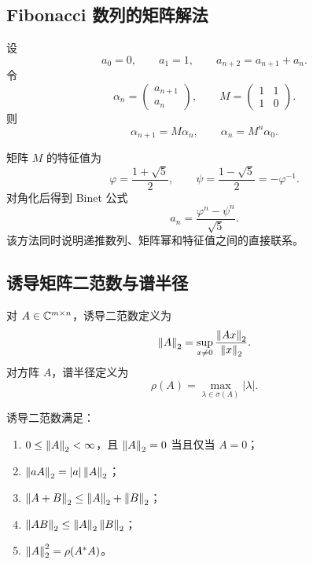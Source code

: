 \subsection{Fibonacci 数列的矩阵解法}

设
\begin{equation}
 a_0=0,
 \qquad a_1=1,
 \qquad a_{n+2}=a_{n+1}+a_n.
\end{equation}
令
\begin{equation}
 \alpha_n=\begin{pmatrix}a_{n+1}\\a_n\end{pmatrix},
 \qquad
 M=\begin{pmatrix}1&1\\1&0\end{pmatrix}.
\end{equation}
则
\begin{equation}
 \alpha_{n+1}=M\alpha_n,
 \qquad
 \alpha_n=M^n\alpha_0.
\end{equation}

矩阵 $M$ 的特征值为
\begin{equation}
 \varphi=\frac{1+\sqrt5}{2},
 \qquad
 \psi=\frac{1-\sqrt5}{2}=-\varphi^{-1}.
\end{equation}
对角化后得到 Binet 公式
\begin{equation}
 a_n=\frac{\varphi^n-\psi^n}{\sqrt5}.
\end{equation}
该方法同时说明递推数列、矩阵幂和特征值之间的直接联系。

\subsection{诱导矩阵二范数与谱半径}

\begin{definition}
对 $A\in\mathbb C^{m\times n}$，诱导二范数定义为
\begin{equation}
 \left\lVert A\right\rVert_2
 =\sup_{x\neq0}\frac{\left\lVert Ax\right\rVert_2}{\left\lVert x\right\rVert_2}.
\end{equation}
对方阵 $A$，谱半径定义为
\begin{equation}
 \rho(A)=\max_{\lambda\in\sigma(A)}|\lambda|.
\end{equation}
\end{definition}

\begin{proposition}
诱导二范数满足：
\begin{enumerate}
  \item $0\leq\left\lVert A\right\rVert_2<\infty$，且 $\left\lVert A\right\rVert_2=0$ 当且仅当 $A=0$；
  \item $\left\lVert aA\right\rVert_2=|a|\left\lVert A\right\rVert_2$；
  \item $\left\lVert A+B\right\rVert_2\leq\left\lVert A\right\rVert_2+\left\lVert B\right\rVert_2$；
  \item $\left\lVert AB\right\rVert_2\leq\left\lVert A\right\rVert_2\left\lVert B\right\rVert_2$；
  \item $\left\lVert A\right\rVert_2^2=\rho(A^*A)$。
\end{enumerate}
\end{proposition}

